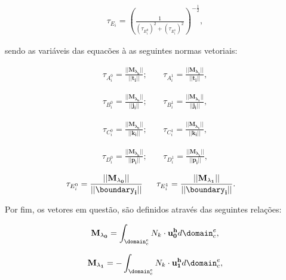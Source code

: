 \begin{align}
	\tau_{E_{i}} = \left(\frac{1}{\left(\tau_{E_i^{0}}\right)^{2} + \left(\tau_{E_i^{1}}\right)^{2}} \right)^{-\frac{1}{2}},\label{eq:tEi}
\end{align}

\noindent sendo as variáveis das equacões  à  as seguintes normas vetoriais:

\begin{align}
	\tau_{A_i^{0}} = \frac{|| \mathbf{M_{\lambda_0}} || }{||\mathbf{t_{i}} ||}; \ \ \ \ \  & \tau_{A_i^{1}} = \frac{|| \mathbf{M_{\lambda_1}} || }{||\mathbf{t_{i}} ||}  ,
\end{align}


\begin{align}
	\tau_{B_i^{0}} = \frac{|| \mathbf{M_{\lambda_0}} || }{||\mathbf{j_{i}} ||}; \ \ \ \ \  &  \tau_{B_i^{1}} = \frac{|| \mathbf{M_{\lambda_1}} || }{||\mathbf{j_{i}} ||}, 
\end{align}

\begin{align}
	\tau_{C_i^{0}} = \frac{|| \mathbf{M_{\lambda_0}} || }{||\mathbf{k_{i}} ||}; \ \ \ \ \  & \tau_{C_i^{1}} = \frac{|| \mathbf{M_{\lambda_1}} || }{||\mathbf{k_{i}} ||},
\end{align}


\begin{align}
	\tau_{D_i^{0}} = \frac{|| \mathbf{M_{\lambda_0}} || }{||\mathbf{p_{i}} ||}; \ \ \ \ \  & \tau_{D_i^{1}} = \frac{|| \mathbf{M_{\lambda_1}} || }{||\mathbf{p_{i}} ||}, 
\end{align}


\begin{align}
	\tau_{E_i^{0}} = \frac{|| \mathbf{M_{\lambda_0}} || }{||\mathbf{\boundary_{i}} ||} \ \ \ \ \  & \tau_{E_i^{1}} = \frac{|| \mathbf{M_{\lambda_1}} || }{||\mathbf{\boundary_{i}} ||}.
\end{align}

Por fim, os vetores em questão, são definidos através das seguintes relações:


\begin{align}
	\mathbf{M_{\lambda_0}} = \int_{\domain_{c}^{e}} N_{k} \cdot \mathbf{u_{0}^{h}} d\domain_{c}^{e},
\end{align}

\begin{align}
	\mathbf{M_{\lambda_1}} = - \int_{\domain_{c}^{e}} N_{k} \cdot \mathbf{u_{1}^{h}} d\domain_{c}^{e},
\end{align}

